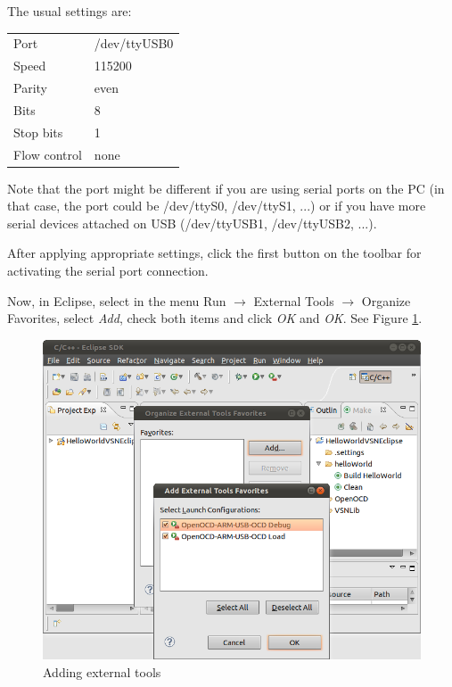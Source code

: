 \documentclass[a4paper, 10pt]{article}
\begin{document}

The usual settings are:

    \smallskip
    \begin{tabular}{ l l }
    Port         & /dev/ttyUSB0 \\
    Speed        & 115200       \\
    Parity       & even         \\
    Bits         & 8            \\
    Stop bits    & 1            \\
    Flow control & none         \\
    \end{tabular}
    \smallskip

Note that the port might be different if you are using serial ports on the PC
(in that case, the port could be /dev/ttyS0, /dev/ttyS1, ...)
or if you have more serial devices attached on USB (/dev/ttyUSB1, /dev/ttyUSB2, ...).

After applying appropriate settings, click the first button on the toolbar for
activating the serial port connection.

Now, in Eclipse, select
in the menu
Run $\rightarrow$ External Tools $\rightarrow$ Organize Favorites,
select \emph{Add}, check both items and click \emph{OK} and \emph{OK}.
See Figure \ref{fig:compile-external-tools}.

    \begin{figure}[H]
    \centering
        \includegraphics[width=\textwidth]{./png-install-guide/compile-external-tools.png}
        \caption{Adding external tools}
        \label{fig:compile-external-tools}
    \end{figure}
\end{document}
